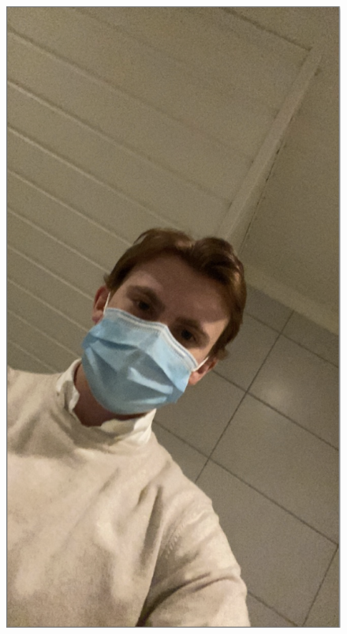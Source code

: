 \begin{figure}[h]
        {\includegraphics[scale = 0.2]{figures/0129.png}\hspace{1cm}}
    \subfloat

\end{figure}
